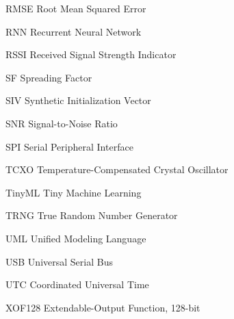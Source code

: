 \documentclass[
	12pt,				%
	openright,			%
	twoside,			%
	a4paper,			%
	english,			%
	brazilian				%
	]{abntex2}
\begin{document}
\begin{siglas}
  \item[RMSE] Root Mean Squared Error
  \item[RNN] Recurrent Neural Network
  \item[RSSI] Received Signal Strength Indicator
  \item[SF] Spreading Factor
  \item[SIV] Synthetic Initialization Vector
  \item[SNR] Signal-to-Noise Ratio
  \item[SPI] Serial Peripheral Interface
  \item[TCXO] Temperature-Compensated Crystal Oscillator
  \item[TinyML] Tiny Machine Learning
  \item[TRNG] True Random Number Generator
  \item[UML] Unified Modeling Language
  \item[USB] Universal Serial Bus
  \item[UTC] Coordinated Universal Time
  \item[XOF128] Extendable-Output Function, 128-bit
\end{siglas}
\end{document}
